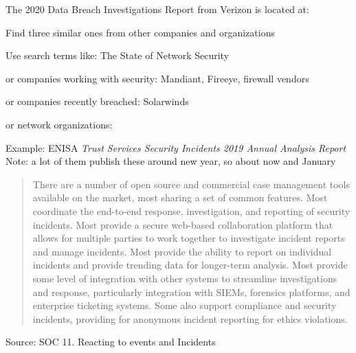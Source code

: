\documentclass[Screen16to9,17pt]{foils}
\begin{document}
\begin{list2}
\item The 2020 Data Breach Investigations Report from Verizon is located at:\\
\item Find three similar ones from other companies and organizations

\item Use search terms like: The State of Network Security
\item or companies working with security: Mandiant, Fireeye, firewall vendors
\item or companies recently breached: Solarwinds
\item or network organizations:
\end{list2}
Example: ENISA \emph{Trust Services Security Incidents 2019 Annual Analysis Report}\\
Note: a lot of them publish these around new year, so about now and January




\begin{quote}
There are a number of open source and commercial case management tools available on the market, most sharing a set of common features. Most coordinate the end-to-end response, investigation, and reporting of security incidents. Most provide a secure web-based collaboration platform that allows for multiple parties to work together to investigate incident reports and manage incidents. Most provide the ability to report on individual incidents and provide trending data for longer-term analysis. Most provide some level of integration with other systems to streamline investigations and response, particularly integration with SIEMs, forensics platforms, and enterprise ticketing systems. Some also support compliance and security incidents, providing for anonymous incident reporting for ethics violations.
\end{quote}
Source:  SOC 11. Reacting to events and Incidents


\end{document}
